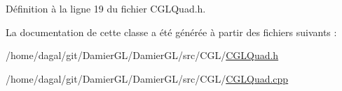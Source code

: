 Définition à la ligne 19 du fichier C\-G\-L\-Quad.\-h.



La documentation de cette classe a été générée à partir des fichiers suivants \-:\begin{DoxyCompactItemize}
\item 
/home/dagal/git/\-Damier\-G\-L/\-Damier\-G\-L/src/\-C\-G\-L/\hyperlink{_c_g_l_quad_8h}{C\-G\-L\-Quad.\-h}\item 
/home/dagal/git/\-Damier\-G\-L/\-Damier\-G\-L/src/\-C\-G\-L/\hyperlink{_c_g_l_quad_8cpp}{C\-G\-L\-Quad.\-cpp}\end{DoxyCompactItemize}
